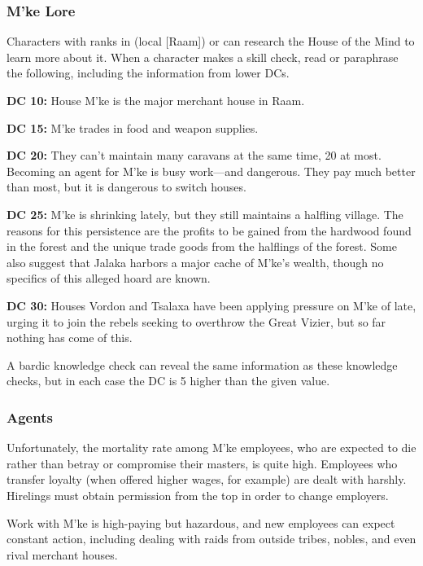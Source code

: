 \subsubsection{M'ke Lore}
Characters with ranks in  (local [Raam]) or  can research the House of the Mind to learn more about it. When a character makes a skill check, read or paraphrase the following, including the information from lower DCs.

\textbf{DC 10:} House M'ke is the major merchant house in Raam.

\textbf{DC 15:} M'ke trades in food and weapon supplies.

\textbf{DC 20:} They can't maintain many caravans at the same time, 20 at most. Becoming an agent for M'ke is busy work---and dangerous. They pay much better than most, but it is dangerous to switch houses.

\textbf{DC 25:} M'ke is shrinking lately, but they still maintains a halfling village. The reasons for this persistence are the profits to be gained from the hardwood found in the forest and the unique trade goods from the halflings of the forest. Some also suggest that Jalaka harbors a major cache of M'ke's wealth, though no specifics of this alleged hoard are known.

\textbf{DC 30:} Houses Vordon and Tsalaxa have been applying pressure on M’ke of late, urging it to join the rebels seeking to overthrow the Great Vizier, but so far nothing has come of this.

A bardic knowledge check can reveal the same information as these knowledge checks, but in each case the DC is 5 higher than the given value.

\subsubsection{Agents}
Unfortunately, the mortality rate among M'ke employees, who are expected to die rather than betray or compromise their masters, is quite high. Employees who transfer loyalty (when offered higher wages, for example) are dealt with harshly. Hirelings must obtain permission from the top in order to change employers.

Work with M'ke is high-paying but hazardous, and new employees can expect constant action, including dealing with raids from outside tribes, nobles, and even rival merchant houses.

